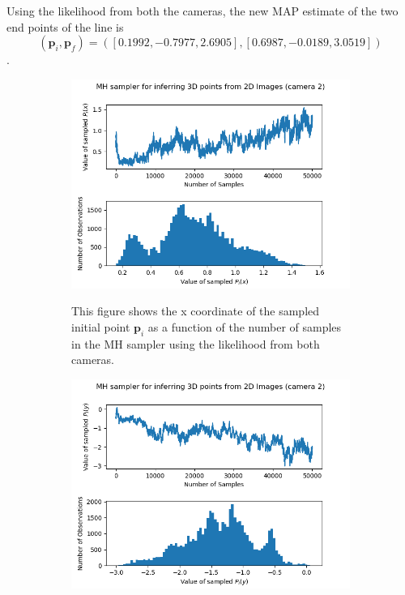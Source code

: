 \documentclass[10pt]{article}
\begin{document}
Using the likelihood from both the cameras, the new MAP estimate of the two end points of the line is $$(\mathbf{p}_i, \mathbf{p}_f) = ([ 0.1992, -0.7977,  2.6905],[0.6987, -0.0189, 3.0519])$$. 


\begin{figure}[h!]
\centering
\begin{subfigure}[]{.320\textwidth}
  \centering
  \includegraphics[width=1\linewidth]{figures/p_i_x12.png}
  \label{fig:t3pix}
\caption{This figure shows the x coordinate of the sampled initial point $\mathbf{p}_i$ as a function of the number of samples in the MH sampler using the likelihood from both cameras.}
\end{subfigure}
\begin{subfigure}[]{.320\textwidth}
  \centering
  \includegraphics[width=1\linewidth]{figures/p_i_y12.png}

\end{subfigure}
\end{figure}
\end{document}
